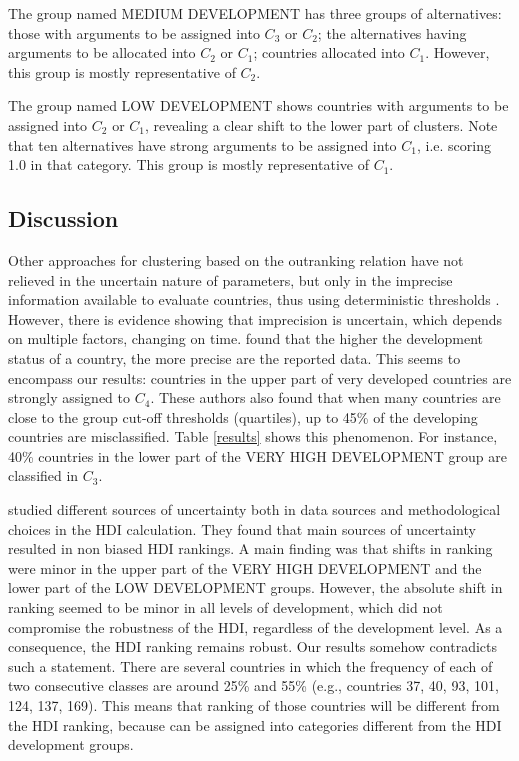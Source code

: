 \documentclass[]{elsarticle}
\theoremstyle{definition}
\begin{document}
The group named MEDIUM DEVELOPMENT has three groups of alternatives: those with arguments to be assigned into $C_3$ or $C_2$; the alternatives having arguments to be allocated into $C_2$ or $C_1$; countries allocated into $C_1$.  However, this group is mostly representative of $C_2$.

The group named LOW DEVELOPMENT shows countries with arguments to be assigned into $C_2$ or $C_1$, revealing a clear shift to the lower part of clusters. Note that ten alternatives have strong arguments to be assigned into $C_1$, i.e. scoring 1.0 in that category. This group is mostly representative of $C_1$.




\subsection{Discussion}


Other approaches for clustering based on the outranking relation have not relieved in the uncertain nature of parameters, but only in the imprecise information available to evaluate countries, thus using deterministic thresholds \citep{DeSmet2012, DeSmet2014, Fernandez2010, Chen2018}. However, there is evidence showing that imprecision is uncertain, which depends on multiple factors, changing on time. \cite{Wolff2011} found that  the higher the development status of a country, the more precise are the reported data. This seems to encompass our results: countries in the upper part of very developed countries are strongly assigned to $C_4$.  These authors also found that when many countries are close to the group cut-off thresholds (quartiles), up to 45\% of the developing countries are misclassified.  Table \ref{results} shows this phenomenon. For instance, 40\% countries in the lower part of the VERY HIGH DEVELOPMENT group  are classified in $C_3$.  

\cite{Garcia2010} studied different sources of uncertainty both in data sources and methodological choices in the HDI calculation. They found that main sources of uncertainty resulted in non biased HDI rankings. A main finding was that shifts in ranking were minor in the upper part of the VERY HIGH DEVELOPMENT and the lower part of the LOW DEVELOPMENT  groups. However, the absolute shift in ranking seemed to be minor in all levels of development, which did not compromise the robustness of the HDI, regardless of the development level.  As a consequence, the HDI ranking remains robust.  Our results somehow contradicts such a statement. There are several countries in which the frequency of each of two consecutive classes are around 25\% and 55\% (e.g., countries 37, 40, 93, 101, 124, 137, 169).  This means that ranking of those countries will be different from the HDI ranking, because can be assigned into categories different from the HDI development groups.
\end{document}
